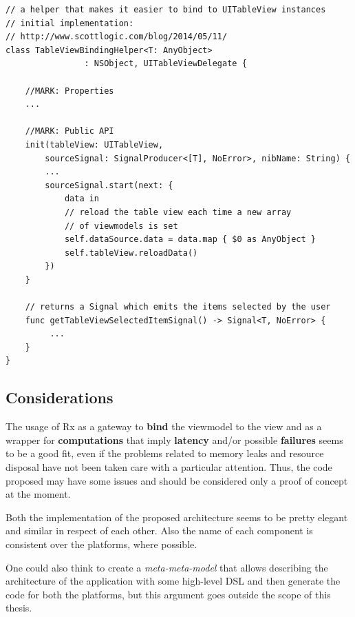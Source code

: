 \begin{verbatim}
// a helper that makes it easier to bind to UITableView instances
// initial implementation: 
// http://www.scottlogic.com/blog/2014/05/11/
class TableViewBindingHelper<T: AnyObject> 
				: NSObject, UITableViewDelegate {

    //MARK: Properties
    ...

    //MARK: Public API
    init(tableView: UITableView,
        sourceSignal: SignalProducer<[T], NoError>, nibName: String) {
        ...
        sourceSignal.start(next: {
            data in
            // reload the table view each time a new array 
            // of viewmodels is set
            self.dataSource.data = data.map { $0 as AnyObject }
            self.tableView.reloadData()
        })
    }

    // returns a Signal which emits the items selected by the user
    func getTableViewSelectedItemSignal() -> Signal<T, NoError> {
         ...
    }
}
\end{verbatim}


\subsection{Considerations}\label{considerations}

The usage of Rx as a gateway to \textbf{bind} the viewmodel to the view
and as a wrapper for \textbf{computations} that imply \textbf{latency}
and/or possible \textbf{failures} seems to be a good fit, even if the
problems related to memory leaks and resource disposal have not been
taken care with a particular attention. Thus, the code proposed may have
some issues and should be considered only a proof of concept at the
moment.

Both the implementation of the proposed architecture seems to be pretty
elegant and similar in respect of each other. Also the name of each
component is consistent over the platforms, where possible.

One could also think to create a \emph{meta-meta-model} that allows 
describing the architecture of the application with some high-level DSL
and then generate the code for both the platforms, but this argument
goes outside the scope of this thesis.


